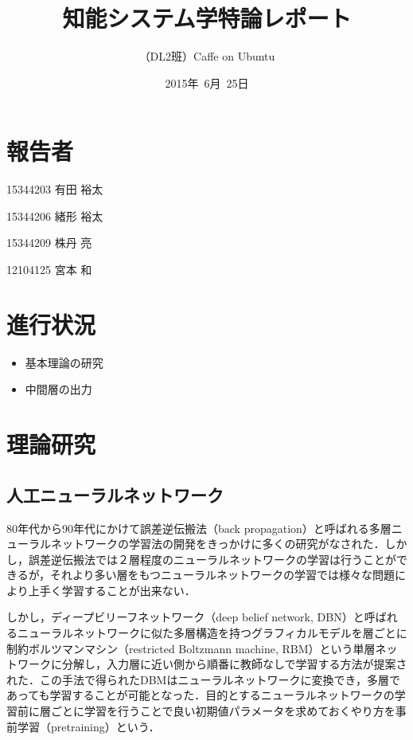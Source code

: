 \documentclass[a4paper,10pt]{jsarticle}
\title{知能システム学特論レポート}
\author{
（DL2班）Caffe on Ubuntu\\
}
\date{2015年\ 6月\ 25日}
\begin{document}
\maketitle
\section{報告者}
\begin{list}{}{}
 \item 15344203\hspace{0.5cm} 有田 裕太
 \item 15344206\hspace{0.5cm} 緒形 裕太
 \item 15344209\hspace{0.5cm} 株丹 亮
 \item 12104125\hspace{0.5cm} 宮本 和
\end{list}

\section{進行状況}
\begin{itemize}
\item 基本理論の研究
\item 中間層の出力
\end{itemize}

\section{理論研究}
\subsection{人工ニューラルネットワーク}
80年代から90年代にかけて誤差逆伝搬法（back propagation）と呼ばれる多層ニューラルネットワークの学習法の開発をきっかけに多くの研究がなされた．しかし，誤差逆伝搬法では２層程度のニューラルネットワークの学習は行うことができるが，それより多い層をもつニューラルネットワークの学習では様々な問題により上手く学習することが出来ない．

しかし，ディープビリーフネットワーク（deep belief network, DBN）と呼ばれ
るニューラルネットワークに似た多層構造を持つグラフィカルモデルを層ごとに
制約ボルツマンマシン（restricted Boltzmann machine, RBM）という単層ネットワークに分解し，入力層に近い側から順番に教師なしで学習する方法が提案された．この手法で得られたDBMはニューラルネットワークに変換でき，多層であっても学習することが可能となった．目的とするニューラルネットワークの学習前に層ごとに学習を行うことで良い初期値パラメータを求めておくやり方を事前学習（pretraining）という．
\end{document}
